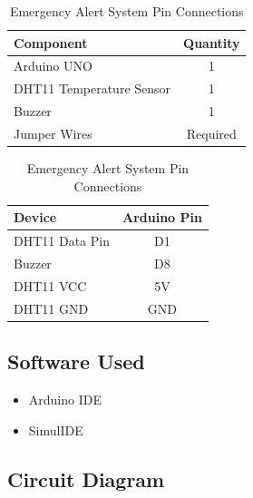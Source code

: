 \begin{table}[H]
\centering

\begin{minipage}[t]{0.52\textwidth}
\centering
\caption{Emergency Alert System Components}
\label{tab:alert_components}

\begin{tabular}{|p{4cm}|c|}
\hline
\textbf{Component} & \textbf{Quantity} \\
\hline
Arduino UNO & 1 \\
DHT11 Temperature Sensor & 1 \\
Buzzer & 1 \\
Jumper Wires & Required \\
\hline
\end{tabular}

\end{minipage}
\hfill
\begin{minipage}[t]{0.42\textwidth}
\centering
\caption{Emergency Alert System Pin Connections}
\label{tab:alert_pins}

\begin{tabular}{|l|c|}
\hline
\textbf{Device} & \textbf{Arduino Pin} \\
\hline
DHT11 Data Pin & D1 \\
Buzzer & D8 \\
DHT11 VCC & 5V \\
DHT11 GND & GND \\
\hline
\end{tabular}

\end{minipage}

\end{table}


\subsection{Software Used}

\begin{itemize}
    \item Arduino IDE
    \item SimulIDE
\end{itemize}


\subsection{Circuit Diagram}

